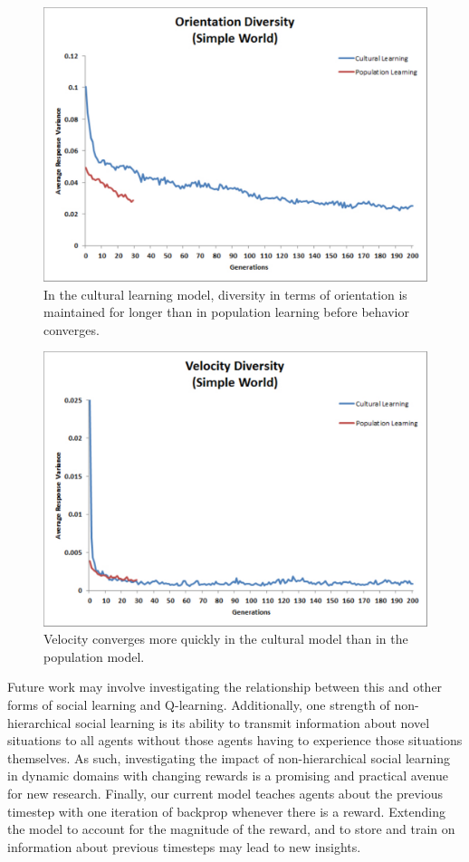 \documentclass{acm_proc_article-sp}
\begin{document}
\begin{figure}
  \centering
    \includegraphics[scale=.35]{orientation_diversity.pdf}
  \caption{In the cultural learning model, diversity in terms of orientation is maintained for longer than in population learning before behavior converges.}
  \label{fig:orientation}
\end{figure}

\begin{figure}
  \centering
    \includegraphics[scale=.35]{velocity_diversity.pdf}
  \caption{Velocity converges more quickly in the cultural model than in the population model.}
  \label{fig:velocity}
\end{figure}

Future work may involve investigating the relationship between this and other forms of social learning and Q-learning.  Additionally, one strength of non-hierarchical social learning is its ability to transmit information about novel situations to all agents without those agents having to experience those situations themselves.  As such, investigating the impact of non-hierarchical social learning in dynamic domains with changing rewards is a promising and practical avenue for new research.  Finally, our current model teaches agents about the previous timestep with one iteration of backprop whenever there is a reward.  Extending the model to account for the magnitude of the reward, and to store and train on information about previous timesteps may lead to new insights.   
\end{document}
